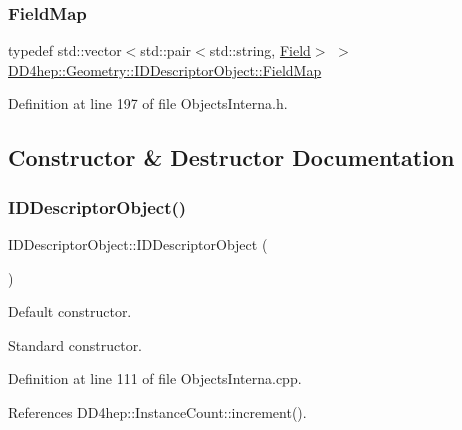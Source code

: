\subsubsection{\texorpdfstring{Field\+Map}{FieldMap}}
{\footnotesize\ttfamily typedef std\+::vector$<$std\+::pair$<$std\+::string, \hyperlink{class_d_d4hep_1_1_geometry_1_1_i_d_descriptor_object_acd5cae904f0db0ed0805ef1077ce2111}{Field}$>$ $>$ \hyperlink{class_d_d4hep_1_1_geometry_1_1_i_d_descriptor_object_a784af03aa08575a914c2399b45eae052}{D\+D4hep\+::\+Geometry\+::\+I\+D\+Descriptor\+Object\+::\+Field\+Map}}



Definition at line 197 of file Objects\+Interna.\+h.



\subsection{Constructor \& Destructor Documentation}
\hypertarget{class_d_d4hep_1_1_geometry_1_1_i_d_descriptor_object_a42a00825ff023bcce96505e616599e94}{}\label{class_d_d4hep_1_1_geometry_1_1_i_d_descriptor_object_a42a00825ff023bcce96505e616599e94} 
\subsubsection{\texorpdfstring{I\+D\+Descriptor\+Object()}{IDDescriptorObject()}\hspace{0.1cm}{\footnotesize\ttfamily [1/2]}}
{\footnotesize\ttfamily I\+D\+Descriptor\+Object\+::\+I\+D\+Descriptor\+Object (\begin{DoxyParamCaption}{ }\end{DoxyParamCaption})}



Default constructor. 

Standard constructor. 

Definition at line 111 of file Objects\+Interna.\+cpp.



References D\+D4hep\+::\+Instance\+Count\+::increment().

\hypertarget{class_d_d4hep_1_1_geometry_1_1_i_d_descriptor_object_a9255ad3ebfdcc22225b2ca01cfd99442}{}\label{class_d_d4hep_1_1_geometry_1_1_i_d_descriptor_object_a9255ad3ebfdcc22225b2ca01cfd99442} 
